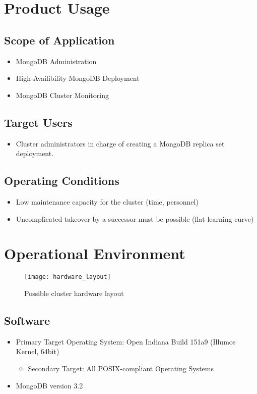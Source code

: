 \documentclass[a4paper, 11pt]{article}
\let\oldsection\section
\renewcommand\section{\clearpage\oldsection}
\begin{document}
\section{Product Usage}

\subsection{Scope of Application}
\begin{itemize}
\item \gls{MongoDB}  Administration
\item High-Availibility MongoDB Deployment
\item MongoDB Cluster Monitoring
\end{itemize}

\subsection{Target Users}
\begin{itemize}
\item Cluster \glspl{administrator} in charge of creating a MongoDB replica set deployment.
\end{itemize}

\subsection{Operating Conditions}
\begin{itemize}

\item Low maintenance capacity for the cluster (time, personnel)
\item Uncomplicated takeover by a successor must be possible (flat learning curve)
\end{itemize}

\section{Operational Environment}

\begin{figure}[H]
	\centering
	\texttt{[image: hardware\_layout]}
	\caption{Possible cluster hardware layout}
\end{figure}

\subsection{Software}\label{subsec:Software}
\begin{itemize}
\item Primary Target Operating System: Open Indiana Build 151a9 (Illumos Kernel, 64bit)
\begin{itemize}
	\item Secondary Target: All POSIX-compliant Operating Systems
\end{itemize}
\item MongoDB version 3.2
\end{itemize}
\end{document}
